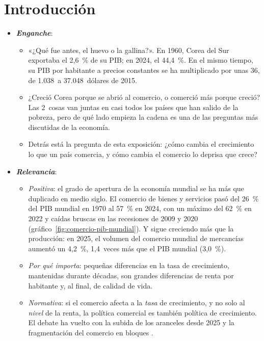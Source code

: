\documentclass[11pt]{article}
\begin{document}
\tceetitulo

\section*{Introducción}

\begin{itemize}
\item \textbf{\emph{Enganche}}:
  \begin{itemize}
  \item «¿Qué fue antes, el huevo o la gallina?». En 1960, Corea del Sur exportaba el 2,6~\% de su PIB; en 2024, el 44,4~\%. En el mismo tiempo, su PIB por habitante a precios constantes se ha multiplicado por unas 36, de 1.038~a 37.048~dólares de 2015\nocite{BancoMundial2026Corea}.
  \item ¿Creció Corea porque se abrió al comercio, o comerció más porque creció? Las 2~cosas van juntas en casi todos los países que han salido de la pobreza, pero de qué lado empieza la cadena es una de las preguntas más discutidas de la economía.
  \item Detrás está la pregunta de esta exposición: ¿cómo cambia el crecimiento lo que un país comercia, y cómo cambia el comercio lo deprisa que crece?
  \end{itemize}

\item \textbf{\emph{Relevancia}}:
  \begin{itemize}
  \item \emph{Positiva}: el grado de apertura de la economía mundial se ha más que duplicado en medio siglo. El comercio de bienes y servicios pasó del 26~\% del PIB mundial en 1970 al 57~\% en 2024, con un máximo del 62~\% en 2022 y caídas bruscas en las recesiones de 2009 y 2020\nocite{BancoMundial2026Apertura} (gráfico~\ref{fig:comercio-pib-mundial}). Y sigue creciendo más que la producción: en 2025, el volumen del comercio mundial de mercancías aumentó un 4,2~\%, 1,4~veces más que el PIB mundial (3,0~\%)\nocite{OMC2026PerspectivasOct}.
  \item \emph{Por qué importa}: pequeñas diferencias en la tasa de crecimiento, mantenidas durante décadas, son grandes diferencias de renta por habitante y, al final, de calidad de vida.
  \item \emph{Normativa}: si el comercio afecta a la \emph{tasa} de crecimiento, y no solo al \emph{nivel} de la renta, la política comercial es también política de crecimiento. El debate ha vuelto con la subida de los aranceles desde 2025 y la fragmentación del comercio en bloques .
  \end{itemize}
\end{itemize}
\end{document}
